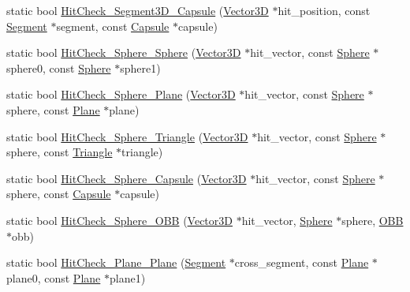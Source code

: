 \begin{DoxyCompactItemize}
\item 
static bool \mbox{\hyperlink{class_collision_judgment_a21938f544146999d01d96f855277727b}{Hit\+Check\+\_\+\+Segment3\+D\+\_\+\+Capsule}} (\mbox{\hyperlink{class_vector3_d}{Vector3D}} $\ast$hit\+\_\+position, const \mbox{\hyperlink{class_segment}{Segment}} $\ast$segment, const \mbox{\hyperlink{class_capsule}{Capsule}} $\ast$capsule)
\item 
static bool \mbox{\hyperlink{class_collision_judgment_a21e4ce202f713f1b2a7fc593f4daf7d2}{Hit\+Check\+\_\+\+Sphere\+\_\+\+Sphere}} (\mbox{\hyperlink{class_vector3_d}{Vector3D}} $\ast$hit\+\_\+vector, const \mbox{\hyperlink{class_sphere}{Sphere}} $\ast$sphere0, const \mbox{\hyperlink{class_sphere}{Sphere}} $\ast$sphere1)
\item 
static bool \mbox{\hyperlink{class_collision_judgment_a47628fb2aef868f75942f378f63478cc}{Hit\+Check\+\_\+\+Sphere\+\_\+\+Plane}} (\mbox{\hyperlink{class_vector3_d}{Vector3D}} $\ast$hit\+\_\+vector, const \mbox{\hyperlink{class_sphere}{Sphere}} $\ast$sphere, const \mbox{\hyperlink{class_plane}{Plane}} $\ast$plane)
\item 
static bool \mbox{\hyperlink{class_collision_judgment_a2b4e851cf1fc45dca09175b36fb4f50c}{Hit\+Check\+\_\+\+Sphere\+\_\+\+Triangle}} (\mbox{\hyperlink{class_vector3_d}{Vector3D}} $\ast$hit\+\_\+vector, const \mbox{\hyperlink{class_sphere}{Sphere}} $\ast$sphere, const \mbox{\hyperlink{class_triangle}{Triangle}} $\ast$triangle)
\item 
static bool \mbox{\hyperlink{class_collision_judgment_a4cc335999fcbeadf0aa1b6ebcb749e5b}{Hit\+Check\+\_\+\+Sphere\+\_\+\+Capsule}} (\mbox{\hyperlink{class_vector3_d}{Vector3D}} $\ast$hit\+\_\+vector, const \mbox{\hyperlink{class_sphere}{Sphere}} $\ast$sphere, const \mbox{\hyperlink{class_capsule}{Capsule}} $\ast$capsule)
\item 
static bool \mbox{\hyperlink{class_collision_judgment_acd1d157a361d756632c73f4406442ce2}{Hit\+Check\+\_\+\+Sphere\+\_\+\+O\+BB}} (\mbox{\hyperlink{class_vector3_d}{Vector3D}} $\ast$hit\+\_\+vector, \mbox{\hyperlink{class_sphere}{Sphere}} $\ast$sphere, \mbox{\hyperlink{class_o_b_b}{O\+BB}} $\ast$obb)
\item 
static bool \mbox{\hyperlink{class_collision_judgment_a01ad684bee6964d4315df1a23ac3ec7d}{Hit\+Check\+\_\+\+Plane\+\_\+\+Plane}} (\mbox{\hyperlink{class_segment}{Segment}} $\ast$cross\+\_\+segment, const \mbox{\hyperlink{class_plane}{Plane}} $\ast$plane0, const \mbox{\hyperlink{class_plane}{Plane}} $\ast$plane1)
\item 

\end{DoxyCompactItemize}
